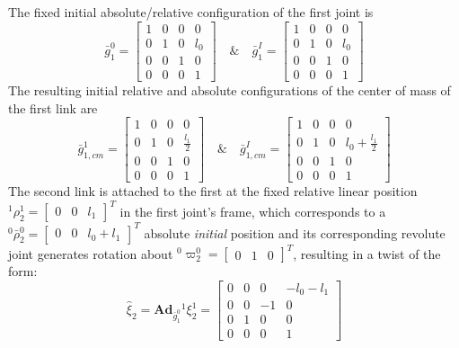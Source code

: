 \documentclass[lettersize,journal]{IEEEtran}
\def \Ad {\textbf{Ad}}
\theoremstyle{remark}
\begin{document}
The fixed initial absolute/relative configuration of the first joint is
\begin{equation*}
    \bar{g}^0_1=\begin{bmatrix}1 &0 &0&0 \\0 &1 &0& l_0\\0 & 0& 1&0 \\0 & 0 & 0 & 1
    \end{bmatrix} \quad \& \quad  \bar{g}^I_1=\begin{bmatrix}1 &0 &0&0 \\0 &1 &0& l_0\\0 & 0& 1&0 \\0 & 0 & 0 & 1
    \end{bmatrix}
\end{equation*}
The resulting initial relative and absolute configurations of the center of mass of the first link are
\begin{equation*}
    \bar{g}^1_{1,cm}=\begin{bmatrix}1 &0 &0&0 \\0 &1 &0& \frac{l_1}{2}\\0 & 0& 1&0 \\0 & 0 & 0 & 1
    \end{bmatrix} \quad \& \quad  \bar{g}^I_{1,cm}=\begin{bmatrix}1 &0 &0&0 \\0 &1 &0& l_0+\frac{l_1}{2}\\0 & 0& 1&0 \\0 & 0 & 0 & 1
    \end{bmatrix}
\end{equation*}
The second link is attached to the first at the fixed relative linear position $^1\rho^1_2=\begin{bmatrix}0 & 0 &l_1\end{bmatrix}^T$ in the first joint's frame, which corresponds to a $ ^0\bar{\rho}^0_2=\begin{bmatrix}0 & 0 &l_0+l_1\end{bmatrix}^T$ absolute \textit{initial} position and its corresponding revolute joint generates rotation about $^0\varpi^0_2=\begin{bmatrix} 0 & 1 & 0\end{bmatrix}^T$, resulting in a twist of the form:
\begin{equation*}
    \hat{\xi}_2=\Ad_{\bar{g}^0_{1}}{}^{1}{\xi}^{1}_2=\begin{bmatrix}0 &0 &0&-l_0-l_1 \\0 &0 &-1& 0\\0 & 1& 0&0 \\0 & 0 & 0 & 1
    \end{bmatrix}
\end{equation*}
\end{document}
